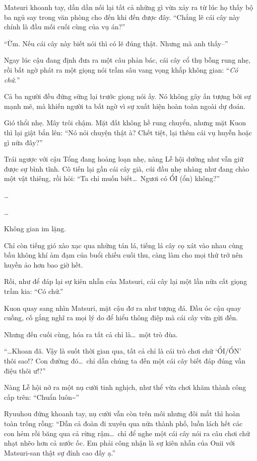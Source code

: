 \documentclass[../main.tex]{subfiles}
\begin{document}
Matsuri khoanh tay, dần dần nối lại tất cả những gì vừa xảy ra từ lúc họ thấy bộ ba ngủ say trong văn phòng cho đến khi đến được đây. ``Chẳng lẽ cái cây này chính là đầu mối cuối cùng của vụ án?''

``Ừm. Nếu cái cây này biết nói thì có lẽ đúng thật. Nhưng mà anh thấy--''

Ngay lúc cậu đang định đưa ra một câu phản bác, cái cây cổ thụ bỗng rung nhẹ, rồi bất ngờ phát ra một giọng nói trầm sâu vang vọng khắp không gian: ``\emph{Có chứ.}''

Cả ba người đều đứng sững lại trước giọng nói ấy. Nó không gây ấn tượng bởi sự mạnh mẽ, mà khiến người ta bất ngờ vì sự xuất hiện hoàn toàn ngoài dự đoán.

Gió thổi nhẹ. Mây trôi chậm. Mặt đất không hề rung chuyển, nhưng mặt Kuon thì lại giật bắn lên: ``Nó nói chuyện thật à? Chết tiệt, lại thêm cái vụ huyễn hoặc gì nữa đây?''

Trái ngược với cậu Tổng đang hoảng loạn nhẹ, nàng Lễ hội dường như vẫn giữ được sự bình tĩnh. Cô tiến lại gần cái cây già, cúi đầu nhẹ nhàng như đang chào một vật thiêng, rồi hỏi: ``Ta chỉ muốn biết\dots\ Ngươi có ỔI (ổn) không?''

\dots

\dots

Không gian im lặng.

Chỉ còn tiếng gió xào xạc qua những tán lá, tiếng lá cây cọ xát vào nhau cùng bầu không khí ảm đạm của buổi chiều cuối thu, càng làm cho mọi thứ trở nên huyền ảo hơn bao giờ hết.

Rồi, như để đáp lại sự kiên nhẫn của Matsuri, cái cây lại một lần nữa cất giọng trầm kia: ``Có chứ.''

Kuon quay sang nhìn Matsuri, mặt cậu đơ ra như tượng đá. Đầu óc cậu quay cuồng, cố gắng nghĩ ra mọi lý do để hiểu thông điệp mà cái cây vừa gửi đến.

Nhưng đến cuối cùng, hóa ra tất cả chỉ là\dots\ một trò đùa.

``\dots Khoan đã. Vậy là suốt thời gian qua, tất cả chỉ là cái trò chơi chữ `ỔI/ỔN' thôi sao!? Con đường đó\dots\ chỉ dẫn chúng ta đến một cái cây biết đáp đúng vần điệu thôi ư!?''

Nàng Lễ hội nở ra một nụ cười tinh nghịch, như thể vừa chơi khăm thành công cấp trên: ``Chuẩn luôn\~{}''

Ryuuhou đứng khoanh tay, nụ cười vẫn còn trên môi nhưng đôi mắt thì hoàn toàn trống rỗng: ``Dẫn cả đoàn đi xuyên qua nửa thành phố, luồn lách hết các con hẻm rồi băng qua cả rừng rậm\dots\ chỉ để nghe một cái cây nói ra câu chơi chữ nhạt nhẽo hơn cả nước ốc. Em phải công nhận là sự kiên nhẫn của Onii với Matsuri-san thật sự đỉnh cao đấy ạ.''
\end{document}

